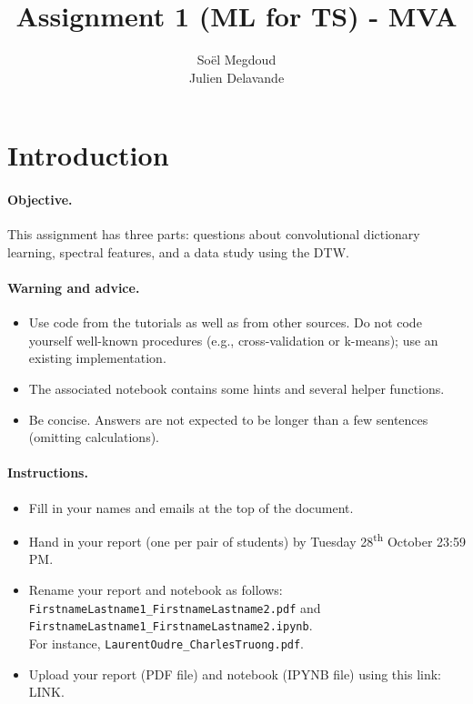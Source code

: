 \documentclass[11pt]{article}
\title{Assignment 1 (ML for TS) - MVA}
\author{
Soël Megdoud \email{Soel.Megdoud@gmail.com} \\ %
Julien Delavande \email{delavandejulien@gmail.com} %
}
\begin{document}
\maketitle

\section{Introduction}

\paragraph{Objective.} This assignment has three parts: questions about convolutional dictionary learning, spectral features, and a data study using the DTW. 

\paragraph{Warning and advice.} 
\begin{itemize}
    \item Use code from the tutorials as well as from other sources. Do not code yourself well-known procedures (e.g., cross-validation or k-means); use an existing implementation. 
    \item The associated notebook contains some hints and several helper functions.
    \item Be concise. Answers are not expected to be longer than a few sentences (omitting calculations).
\end{itemize}



\paragraph{Instructions.}
\begin{itemize}
    \item Fill in your names and emails at the top of the document.
    \item Hand in your report (one per pair of students) by Tuesday 28\textsuperscript{th} October 23:59 PM.
    \item Rename your report and notebook as follows:\\ \texttt{FirstnameLastname1\_FirstnameLastname2.pdf} and\\ \texttt{FirstnameLastname1\_FirstnameLastname2.ipynb}.\\
    For instance, \texttt{LaurentOudre\_CharlesTruong.pdf}.
    \item Upload your report (PDF file) and notebook (IPYNB file) using this link: \footnotesize{LINK}.
\end{itemize}
\end{document}
